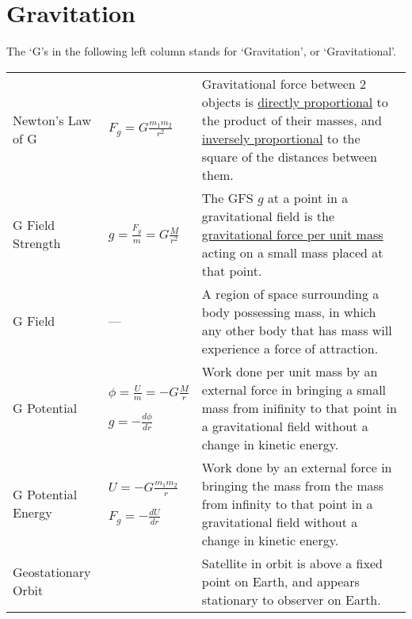 \documentclass[a4paper]{article}
\begin{document}
	\section{Gravitation}
	The `G's in the following left column stands for `Gravitation', or `Gravitational'.
		\begin{center}
			\renewcommand{\arraystretch}{1.5}
			\begin{tabular}{@{} l l p{8cm} @{}}
				\toprule
				Newton's Law of G & $\displaystyle F_g = G\frac{m_1 m_2}{r^2}$ & Gravitational force between 2 objects is \underline{directly proportional} to the product of their masses, and \underline{inversely proportional} to the square of the distances between them. \\
				G Field Strength & $\displaystyle g = \frac{F_g}{m} = G\frac{M}{r^2}$ & The GFS $g$ at a point in a gravitational field is the \underline{gravitational force per unit mass} acting on a small mass placed at that point. \\
				G Field & --- & A region of space surrounding a body possessing mass, in which any other body that has mass will experience a force of attraction.\\
				G Potential & \multicolumn{1}{p{2.6cm}}{$\displaystyle \phi = \frac{U}{m} = -G \frac{M}{r}$ \par \vspace{1.5mm} $\displaystyle g=-\frac{d\phi}{dr}$\vspace{1.5mm}} & Work done per unit mass by an external force in bringing a small mass from inifinity to that point in a gravitational field without a change in kinetic energy.\\
				G Potential Energy & \multicolumn{1}{p{2.6cm}}{$\displaystyle U = -G \frac{m_1 m_2}{r}$ \par \vspace{2mm} $\displaystyle F_g=-\frac{dU}{dr}$} & Work done by an external force in bringing the mass from the mass from infinity to that point in a gravitational field without a change in kinetic energy. \\
				Geostationary Orbit & & Satellite in orbit is above a fixed point on Earth, and appears stationary to observer on Earth. \\
				\bottomrule
			\end{tabular}
		\end{center}
\end{document}
